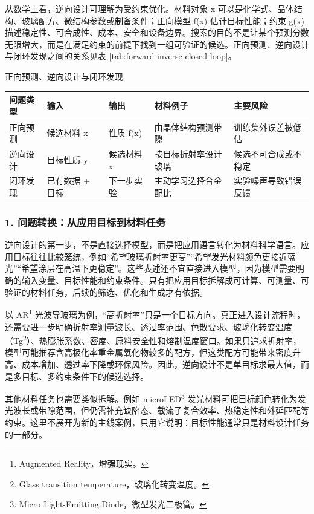 从数学上看，逆向设计可理解为受约束优化。材料对象 x 可以是化学式、晶体结构、玻璃配方、微结构参数或制备条件；正向模型 f(x) 估计目标性能；约束 g(x) 描述稳定性、可合成性、成本、安全和设备边界。搜索的目的不是让某个预测分数无限增大，而是在满足约束的前提下找到一组可验证的候选。正向预测、逆向设计与闭环发现之间的关系见表 \ref{tab:forward-inverse-closed-loop}。


\begin{formalTable}[htbp]
\caption{正向预测、逆向设计与闭环发现}
\label{tab:forward-inverse-closed-loop}
\footnotesize
\begin{tabularx}{\textwidth}{@{}YYYYY@{}}
\toprule
\textbf{问题类型} & \textbf{输入} & \textbf{输出} & \textbf{材料例子} & \textbf{主要风险} \\
\midrule
正向预测 & 候选材料 x & 性质 f(x) & 由晶体结构预测带隙 & 训练集外误差被低估 \\
逆向设计 & 目标性质 y & 候选材料 x & 按目标折射率设计玻璃 & 候选不可合成或不稳定 \\
闭环发现 & 已有数据 + 目标 & 下一步实验 & 主动学习选择合金配比 & 实验噪声导致错误反馈 \\
\bottomrule
\end{tabularx}
\end{formalTable}

\subsubsection*{\textbf{1. 问题转换：从应用目标到材料任务}}

逆向设计的第一步，不是直接选择模型，而是把应用语言转化为材料科学语言。应用目标往往比较笼统，例如“希望玻璃折射率更高”“希望发光材料颜色更接近蓝光”“希望涂层在高温下更稳定”。这些表述还不宜直接进入模型，因为模型需要明确的输入变量、目标性能和约束条件。只有把应用目标拆解成可计算、可测量、可验证的材料任务，后续的筛选、优化和生成才有依据。

以 AR\footnote{Augmented Reality，增强现实。} 光波导玻璃为例，“高折射率”只是一个目标方向。真正进入设计流程时，还需要进一步明确折射率测量波长、透过率范围、色散要求、玻璃化转变温度（Tg\footnote{Glass transition temperature，玻璃化转变温度。}）、热膨胀系数、密度、原料安全性和熔制温度窗口。如果只追求折射率，模型可能推荐含高极化率重金属氧化物较多的配方，但这类配方可能带来密度升高、成本增加、透过率下降或环保风险。因此，逆向设计不是单目标求最大值，而是多目标、多约束条件下的候选选择。

其他材料任务也需要类似拆解。例如 microLED\footnote{Micro Light-Emitting Diode，微型发光二极管。} 发光材料可把目标颜色转化为发光波长或带隙范围，但仍需补充缺陷态、载流子复合效率、热稳定性和外延匹配等约束。这里不展开为新的主线案例，只用它说明：目标性能通常只是材料设计任务的一部分。

